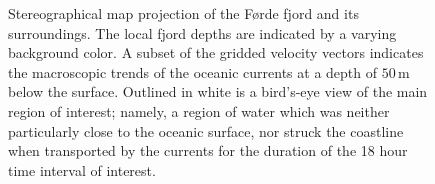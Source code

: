 \begin{figure}[htpb]
    \centering
    \caption[Stereographical map projection of the Førde fjord and its
    surroundings]
    {Stereographical map projection of the Førde fjord and its surroundings.
        The local fjord depths are indicated by a varying background color. A
        subset of the gridded velocity vectors indicates the macroscopic trends
        of the oceanic currents at a depth of $50\,\si{\meter}$ below the
        surface. Outlined in white is a bird's-eye view of the main region of
        interest; namely, a region of water which was neither particularly
        close to the oceanic surface, nor struck the coastline when transported
        by the currents for the duration of the 18 hour time interval of
    interest.}
    \label{fig:currentmap}
\end{figure}

